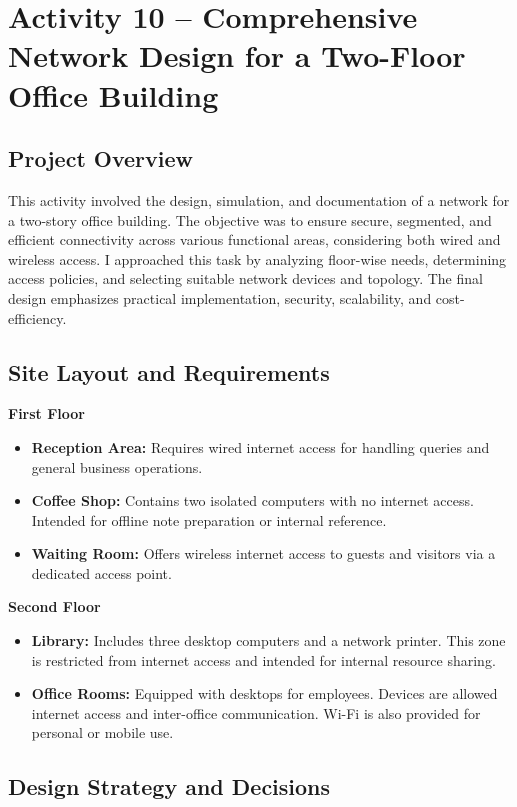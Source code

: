 \documentclass[11pt,a4paper]{article}
\begin{document}
\section{Activity 10 – Comprehensive Network Design for a Two-Floor Office Building}

\subsection{Project Overview}
This activity involved the design, simulation, and documentation of a network for a two-story office building. The objective was to ensure secure, segmented, and efficient connectivity across various functional areas, considering both wired and wireless access. I approached this task by analyzing floor-wise needs, determining access policies, and selecting suitable network devices and topology. The final design emphasizes practical implementation, security, scalability, and cost-efficiency.

\subsection{Site Layout and Requirements}

\textbf{First Floor}
\begin{itemize}
    \item \textbf{Reception Area:} Requires wired internet access for handling queries and general business operations.
    \item \textbf{Coffee Shop:} Contains two isolated computers with no internet access. Intended for offline note preparation or internal reference.
    \item \textbf{Waiting Room:} Offers wireless internet access to guests and visitors via a dedicated access point.
\end{itemize}

\textbf{Second Floor}
\begin{itemize}
    \item \textbf{Library:} Includes three desktop computers and a network printer. This zone is restricted from internet access and intended for internal resource sharing.
    \item \textbf{Office Rooms:} Equipped with desktops for employees. Devices are allowed internet access and inter-office communication. Wi-Fi is also provided for personal or mobile use.
\end{itemize}

\subsection{Design Strategy and Decisions}
\end{document}
